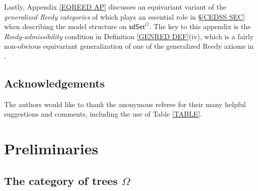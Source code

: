 \documentclass[a4paper,10pt
 ,draft
]{article}%
\begin{document}
Lastly, Appendix \ref{EQREED AP} discusses an equivariant variant of the \textit{generalized Reedy categories}
of \cite{BM11} which plays an essential role in \S \ref{CEDSS SEC}
when describing the model structure on $\mathsf{sdSet}^G$.
The key to this appendix is the \textit{Reedy-admissibility} condition in 
Definition \ref{GENRED DEF}(iv),
which is a fairly non-obvious equivariant generalization of one of the generalized Reedy axioms in \cite{BM11}.

\subsection{Acknowledgements}

The authors would like to thank the anonymous referee for their many helpful suggestions and comments, 
including the use of Table \ref{TABLE}.





\section{Preliminaries}\label{PREL SEC}

\subsection{The category of trees $\Omega$}
\end{document}
